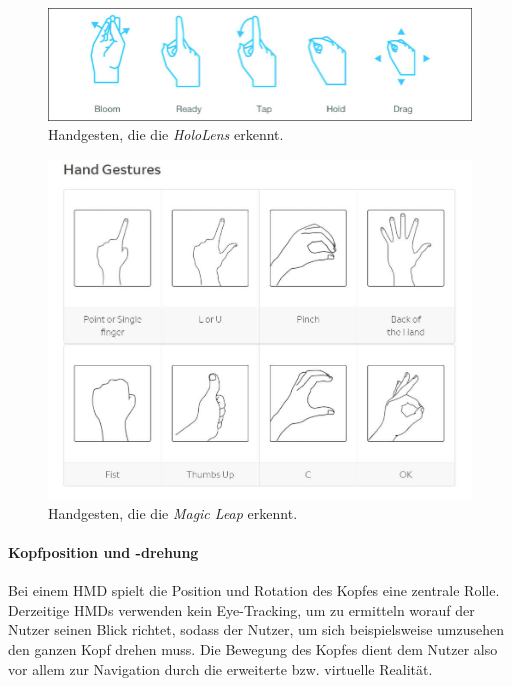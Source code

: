 \begin{figure}[!htb]
	\centering
	\includegraphics[width=0.7\linewidth]{images/hololensGestures.png}
	\caption{Handgesten, die die \textit{HoloLens} erkennt.}
	\label{img:hololensGestures}
\end{figure}
\FloatBarrier

\begin{figure}[!htb]
	\centering
	\includegraphics[width=0.7\linewidth]{images/magicleapGestures.jpg}
	\caption{Handgesten, die die \textit{Magic Leap} erkennt.}
	\label{img:magicGestures}
\end{figure}
\FloatBarrier

\paragraph{Kopfposition und -drehung}

Bei einem HMD spielt die Position und Rotation des Kopfes eine zentrale Rolle. 
Derzeitige HMDs verwenden kein Eye-Tracking, um zu ermitteln worauf der Nutzer seinen Blick richtet, sodass der Nutzer, um sich beispielsweise umzusehen den ganzen Kopf drehen muss. Die Bewegung des Kopfes dient dem Nutzer also vor allem zur Navigation durch die erweiterte bzw. virtuelle Realität. 

